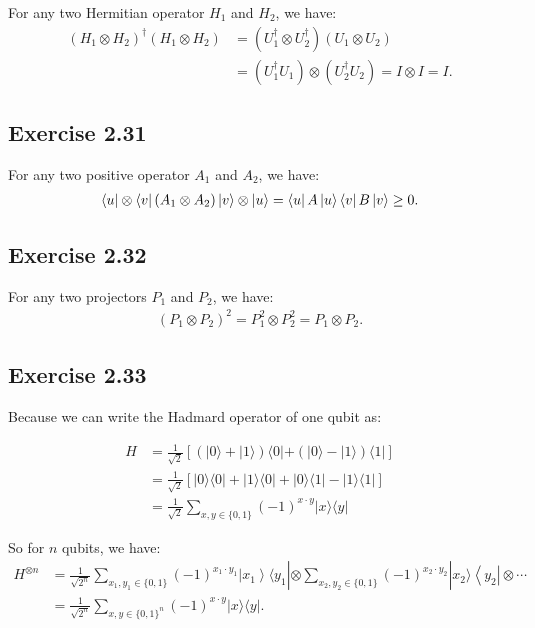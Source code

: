 For any two Hermitian operator $H_1$ and $H_2$, we have:
\begin{align}
(H_1\otimes H_2)^\dagger (H_1\otimes H_2) &=(U_1^\dagger\otimes U_2^\dagger) (U_1\otimes U_2)\\
&=(U_1^\dagger U_1)\otimes (U_2^\dagger U_2)=I\otimes I=I.
\end{align}

\subsection*{Exercise 2.31}

For any two positive operator $A_1$ and $A_2$, we have:
\begin{align}
\bra{u}\otimes\bra{v}(A_1\otimes A_2)\ket{v}\otimes\ket{u}=
\bra{u}A\ket{u}\bra{v}B\ket{v}\geq 0.
\end{align}

\subsection*{Exercise 2.32}

For any two projectors $P_1$ and $P_2$, we have:
\begin{align}
(P_1\otimes P_2)^2=P_1^2 \otimes P_2^2 = P_1\otimes P_2.
\end{align}


\subsection*{Exercise 2.33}

Because we can write the Hadmard operator of one qubit as:

\begin{align}
H &=\frac{1}{\sqrt{2}}[(|0\rangle+|1\rangle)\langle 0|+(|0\rangle-|1\rangle)\langle 1|]\\
&=\frac{1}{\sqrt{2}}[|0\rangle\langle 0|+| 1\rangle\langle 0|+| 0\rangle\langle 1|-| 1\rangle\langle 1|] \\
&=\frac{1}{\sqrt{2}} \sum_{x, y\in\{0,1\}}(-1)^{x \cdot y}|x\rangle\langle y|
\end{align}

So for $n$ qubits, we have:
\begin{align}
H^{\otimes n} &=\frac{1}{\sqrt{2^{n}}} \sum_{x_1, y _1\in\{0,1\}}(-1)^{x_{1} \cdot y_{1}}\left|x_{1}\right\rangle\langle y_{1}|\otimes \sum_{x_{2}, y_{2}\in\{0,1\}}(-1)^{x_{2} \cdot y_{2}}| x_{2}\rangle\left\langle y_{2}\right| \otimes \cdots \\
&=\frac{1}{\sqrt{2^{n}}} \sum_{x, y\in\{0,1\}^n}(-1)^{x \cdot y}|x\rangle\langle y|.
\end{align}

